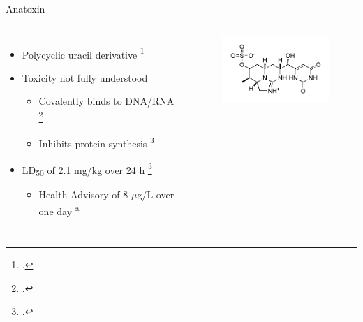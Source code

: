 \begin{frame}{Anatoxin}
\begin{columns}
	\begin{itemize}
		\item Polycyclic uracil derivative \footcite{moreira_cylindrospermopsin:_2013} 
		\item Toxicity not fully understood 
			\begin{itemize}
				\item Covalently binds to DNA/RNA \footcite{kittler_1._2014} 
				\item Inhibits protein synthesis \textsuperscript{3} 
			\end{itemize}
		\item LD\textsubscript{50} of 2.1 mg/kg over 24 h \footcite{shaw_cylindrospermopsin_2000}
			\begin{itemize}
				\item Health Advisory of 8 $\mu$g/L over one day \textsuperscript{a} 
			\end{itemize}
	\end{itemize}
	\begin{figure}
		\hspace*{-10cm}
		\centering
		\includegraphics[width=2in]{cylindro.png}
	\end{figure}
\end{columns}

\end{frame}

